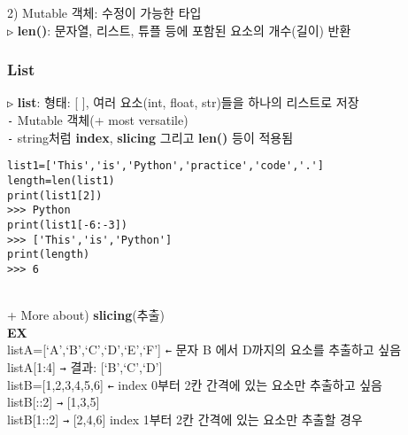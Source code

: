 \documentclass[11pt,a4paper]{article}
\begin{document}
\hspace*{2em}2) Mutable 객체: 수정이 가능한 타입\\

\texttt{▷} \textbf{len()}: 문자열, 리스트, 튜플 등에 포함된 요소의 개수(길이) 반환\\

\subsubsection{\Large\textbf{List}}
\begin{spacing}{1.5}
\texttt{▷} \textbf{list}: 형태: [ ], 여러 요소(int, float, str)들을 하나의 리스트로 저장\\
\texttt{-} Mutable 객체(+ most versatile)\\
\texttt{-} string처럼 \textbf{index}, \textbf{slicing} 그리고 \textbf{len()} 등이 적용됨
\end{spacing}
\begin{lstlisting}[label={list:first},caption=about list]
list1=['This','is','Python','practice','code','.']
length=len(list1)
print(list1[2])
>>> Python
print(list1[-6:-3])
>>> ['This','is','Python']
print(length)
>>> 6
\end{lstlisting}\\

+ More about) \textbf{slicing}(추출)\\
\large\textbf{EX}\\
listA=[`A',`B',`C',`D',`E',`F']      \texttt{←}   문자 B 에서 D까지의 요소를 추출하고 싶음\\
listA[1:4]       \texttt{→}   결과: [`B',`C',`D']\\

listB=[1,2,3,4,5,6]       \texttt{←}    index 0부터 2칸 간격에 있는 요소만 추출하고 싶음\\
listB[::2]       \texttt{→}    [1,3,5]\\
listB[1::2]       \texttt{→}    [2,4,6]     index 1부터 2칸 간격에 있는 요소만 추출할 경우\\
\end{document}
